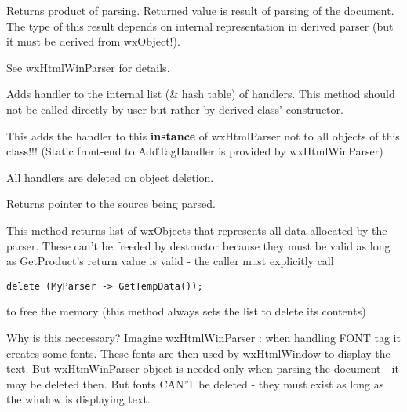 
Returns product of parsing. Returned value is result of parsing 
of the document. The type of this result depends on internal 
representation in derived parser (but it must be derived from wxObject!).

See wxHtmlWinParser for details.


\label{wxhtmlparseraddtaghandler}


Adds handler to the internal list (\& hash table) of handlers. This
method should not be called directly by user but rather by derived class'
constructor.

This adds the handler to this {\bf instance} of wxHtmlParser not to
all objects of this class!!! (Static front-end to AddTagHandler is provided
by wxHtmlWinParser)

All handlers are deleted on object deletion.

\label{wxhtmlparsergetsource}


Returns pointer to the source being parsed.


\label{wxhtmlparsergettempdata}


This method returns list of wxObjects that represents
all data allocated by the parser. These can't be freeded
by destructor because they must be valid as long as
GetProduct's return value is valid - the caller must
explicitly call

\begin{verbatim}
delete (MyParser -> GetTempData());
\end{verbatim}

to free the memory (this method always sets the list to delete its contents)


Why is this neccessary? Imagine wxHtmlWinParser : when handling
FONT tag it creates some fonts. These fonts are then used by wxHtmlWindow
to display the text. But wxHtmWinParser object is needed only when parsing
the document - it may be deleted then. But fonts CAN'T be deleted - they
must exist as long as the window is displaying text. 

